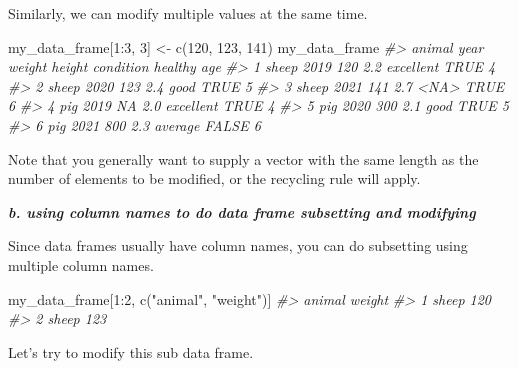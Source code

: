 \documentclass[
]{book}
\newenvironment{Shaded}{\begin{snugshade}}{\end{snugshade}}
\newcommand{\CommentTok}[1]{\textcolor[rgb]{0.56,0.35,0.01}{\textit{#1}}}
\newcommand{\DecValTok}[1]{\textcolor[rgb]{0.00,0.00,0.81}{#1}}
\newcommand{\FunctionTok}[1]{\textcolor[rgb]{0.00,0.00,0.00}{#1}}
\newcommand{\NormalTok}[1]{#1}
\newcommand{\OtherTok}[1]{\textcolor[rgb]{0.56,0.35,0.01}{#1}}
\newcommand{\SpecialCharTok}[1]{\textcolor[rgb]{0.00,0.00,0.00}{#1}}
\newcommand{\StringTok}[1]{\textcolor[rgb]{0.31,0.60,0.02}{#1}}
\begin{document}
Similarly, we can modify multiple values at the same time.

\begin{Shaded}
\begin{Highlighting}[]
\NormalTok{my\_data\_frame[}\DecValTok{1}\SpecialCharTok{:}\DecValTok{3}\NormalTok{, }\DecValTok{3}\NormalTok{] }\OtherTok{\textless{}{-}} \FunctionTok{c}\NormalTok{(}\DecValTok{120}\NormalTok{, }\DecValTok{123}\NormalTok{, }\DecValTok{141}\NormalTok{)}
\NormalTok{my\_data\_frame}
\CommentTok{\#\textgreater{}   animal year weight height condition healthy age}
\CommentTok{\#\textgreater{} 1  sheep 2019    120    2.2 excellent    TRUE   4}
\CommentTok{\#\textgreater{} 2  sheep 2020    123    2.4      good    TRUE   5}
\CommentTok{\#\textgreater{} 3  sheep 2021    141    2.7      \textless{}NA\textgreater{}    TRUE   6}
\CommentTok{\#\textgreater{} 4    pig 2019     NA    2.0 excellent    TRUE   4}
\CommentTok{\#\textgreater{} 5    pig 2020    300    2.1      good    TRUE   5}
\CommentTok{\#\textgreater{} 6    pig 2021    800    2.3   average   FALSE   6}
\end{Highlighting}
\end{Shaded}

Note that you generally want to supply a vector with the same length as the number of elements to be modified, or the recycling rule will apply.

\textbf{\emph{b. using column names to do data frame subsetting and modifying}}

Since data frames usually have column names, you can do subsetting using multiple column names.

\begin{Shaded}
\begin{Highlighting}[]
\NormalTok{my\_data\_frame[}\DecValTok{1}\SpecialCharTok{:}\DecValTok{2}\NormalTok{, }\FunctionTok{c}\NormalTok{(}\StringTok{"animal"}\NormalTok{, }\StringTok{"weight"}\NormalTok{)]}
\CommentTok{\#\textgreater{}   animal weight}
\CommentTok{\#\textgreater{} 1  sheep    120}
\CommentTok{\#\textgreater{} 2  sheep    123}
\end{Highlighting}
\end{Shaded}

Let's try to modify this sub data frame.
\end{document}
